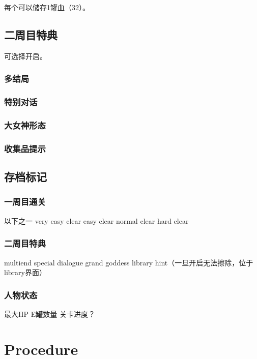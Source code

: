 \documentclass{article}
\begin{document}
每个可以储存1罐血（32）。

\subsection{二周目特典}

可选择开启。

\subsubsection{多结局}

\subsubsection{特别对话}

\subsubsection{大女神形态}

\subsubsection{收集品提示}

\subsection{存档标记}

\subsubsection{一周目通关}

以下之一
very easy clear
easy clear
normal clear
hard clear

\subsubsection{二周目特典}

multiend
special dialogue
grand goddess
library hint（一旦开启无法擦除，位于library界面）

\subsubsection{人物状态}

最大HP
E罐数量
关卡进度？


\section{Procedure}
\end{document}
